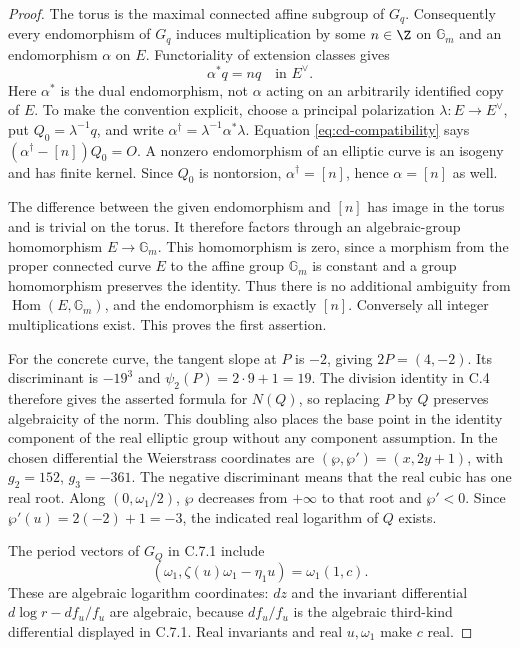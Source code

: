 \begin{proof}
The torus is the maximal connected affine subgroup of $G_q$.
Consequently every endomorphism of $G_q$ induces multiplication
by some $n\in\Z$ on $\mathbb G_m$ and an endomorphism
$\alpha$ on $E$. Functoriality of extension classes gives
\begin{equation}\label{eq:cd-compatibility}
 \alpha^*q=nq\quad\text{in }E^\vee.
\end{equation}
Here $\alpha^*$ is the dual endomorphism, not $\alpha$
acting on an arbitrarily identified copy of $E$. To make the
convention explicit, choose a principal polarization
$\lambda:E\to E^\vee$, put $Q_0=\lambda^{-1}q$, and
write $\alpha^\dagger=\lambda^{-1}\alpha^*\lambda$.
Equation \eqref{eq:cd-compatibility} says
$(\alpha^\dagger-[n])Q_0=O$. A nonzero endomorphism of an
elliptic curve is an isogeny and has finite kernel. Since
$Q_0$ is nontorsion, $\alpha^\dagger=[n]$, hence
$\alpha=[n]$ as well.

The difference between the given endomorphism and $[n]$ has
image in the torus and is trivial on the torus. It therefore
factors through an algebraic-group homomorphism
$E\to\mathbb G_m$. This homomorphism is zero, since a
morphism from the proper connected curve $E$ to the affine
group $\mathbb G_m$ is constant and a group homomorphism
preserves the identity. Thus there is no additional ambiguity
from $\operatorname{Hom}(E,\mathbb G_m)$, and the
endomorphism is exactly $[n]$. Conversely all integer
multiplications exist. This proves the first assertion.

For the concrete curve, the tangent slope at $P$ is $-2$,
giving $2P=(4,-2)$. Its discriminant is $-19^3$ and
$\psi_2(P)=2\cdot9+1=19$. The division identity in C.4
therefore gives the asserted formula for $N(Q)$, so replacing
$P$ by $Q$ preserves algebraicity of the norm. This doubling
also places the base point in the identity component of the
real elliptic group without any component assumption. In the
chosen differential the Weierstrass coordinates are
$(\wp,\wp')=(x,2y+1)$, with $g_2=152$, $g_3=-361$.
The negative discriminant means that the real cubic has one
real root. Along $(0,\omega_1/2)$, $\wp$ decreases from
$+\infty$ to that root and $\wp'<0$. Since
$\wp'(u)=2(-2)+1=-3$, the indicated real logarithm of $Q$
exists.

The period vectors of $G_Q$ in C.7.1 include
\[
 (\omega_1,\zeta(u)\omega_1-\eta_1u)
       =\omega_1(1,c).
\]
These are algebraic logarithm coordinates: $dz$ and the
invariant differential $d\log r-df_u/f_u$ are algebraic,
because $df_u/f_u$ is the algebraic third-kind differential
displayed in C.7.1. Real invariants and real $u,\omega_1$
make $c$ real.


\end{proof}
